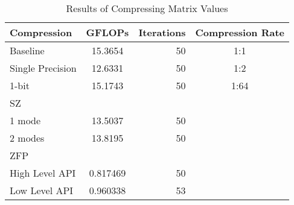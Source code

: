\begin{table}
	\centering
	\begin{tabular}{l|S|r|c}
		Compression & GFLOPs & Iterations & Compression Rate\\
		\hline
		Baseline & 15.3654 & 50 & 1:1 \\
		Single Precision & 12.6331 & 50 & 1:2 \\
		1-bit & 15.1743 & 50 & 1:64 \\ %
		SZ & & & \\
		\hspace{3mm} 1 mode & 13.5037 & 50 & \\
		\hspace{3mm} 2 modes & 13.8195 & 50 & \\
		ZFP & & & \\
		\hspace{3mm}High Level API & 0.817469 & 50 & \\
		\hspace{3mm}Low Level API & 0.960338 & 53 & \\
	\end{tabular}
	\caption{Results of Compressing Matrix Values}
	\label{tab:results-val}
\end{table}
